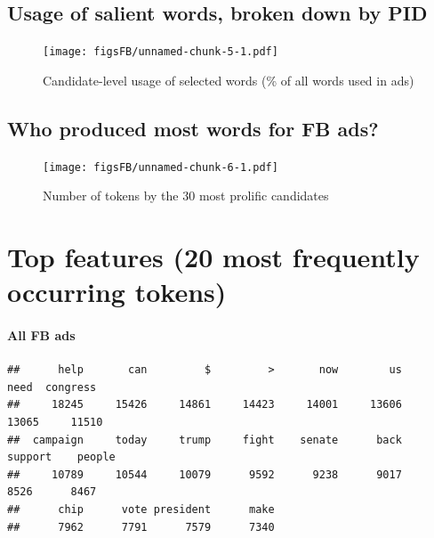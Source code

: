 \documentclass[
  12pt,
]{article}
\begin{document}
\pagebreak

\hypertarget{usage-of-salient-words-broken-down-by-pid}{%
\subsection{Usage of salient words, broken down by PID}\label{usage-of-salient-words-broken-down-by-pid}}

\begin{figure}
\centering
\texttt{[image: figsFB/unnamed-chunk-5-1.pdf]}
\caption{\label{fig:unnamed-chunk-5}Candidate-level usage of selected words (\% of all words used in ads)}
\end{figure}

\hypertarget{who-produced-most-words-for-fb-ads}{%
\subsection{Who produced most words for FB ads?}\label{who-produced-most-words-for-fb-ads}}

\begin{figure}
\centering
\texttt{[image: figsFB/unnamed-chunk-6-1.pdf]}
\caption{\label{fig:unnamed-chunk-6}Number of tokens by the 30 most prolific candidates}
\end{figure}

\pagebreak

\hypertarget{top-features-20-most-frequently-occurring-tokens}{%
\section{Top features (20 most frequently occurring tokens)}\label{top-features-20-most-frequently-occurring-tokens}}

\hypertarget{all-fb-ads}{%
\paragraph{All FB ads}\label{all-fb-ads}}

\begin{verbatim}
##      help       can         $         >       now        us      need  congress 
##     18245     15426     14861     14423     14001     13606     13065     11510 
##  campaign     today     trump     fight    senate      back   support    people 
##     10789     10544     10079      9592      9238      9017      8526      8467 
##      chip      vote president      make 
##      7962      7791      7579      7340
\end{verbatim}
\end{document}
